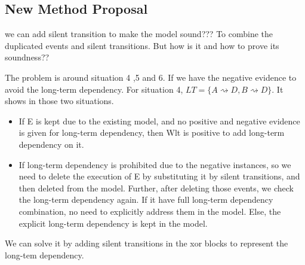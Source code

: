 \subsection{New Method Proposal}
we can add silent transition to make the model sound??? To combine the duplicated events and silent transitions. But how is it and how to prove its soundness?? 

The problem is around situation 4 ,5 and 6. If we have the negative evidence to avoid the long-term dependency. 
For situation 4, $LT=\{ A\rightsquigarrow D, B\rightsquigarrow D\}$. It shows in those two situations. 
\begin{itemize}
	\item If E is kept due to the existing model, and no positive and negative evidence is given for long-term dependency, then Wlt is positive to add long-term dependency on it. 
	\item If long-term dependency is prohibited due to the negative instances, so we need to delete the execution of E by substituting it by silent transitions, and then deleted from the model. Further, after deleting those events, we check the long-term dependency again. If it have full long-term dependency combination, no need to explicitly address them in the model. Else, the explicit long-term dependency is kept in the model. 
\end{itemize}
We can solve it by adding silent transitions in the xor blocks to represent the long-tem dependency. 
